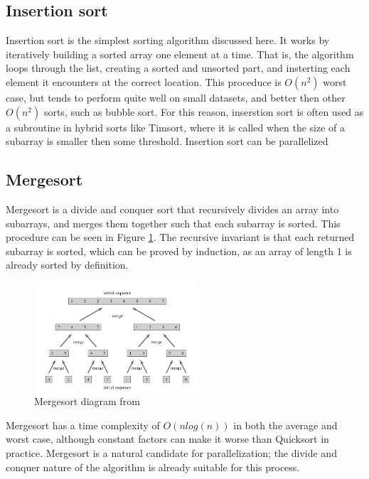 \documentclass[conference]{IEEEtran}
\begin{document}
\subsection{Insertion sort}
Insertion sort is the simplest sorting algorithm discussed here. 
It works by iteratively building a sorted array one element at a time. 
That is, the algorithm loops through the list, creating a sorted and unsorted part, and insterting each element it encounters at the correct location. 
This proceduce is $O(n^2)$ worst case, but tends to perform quite well on small datasets, and better then other $O(n^2)$ sorts, such as bubble sort. \cite{knuth_art_nodate} 
For this reason, inserstion sort is often used as a subroutine in hybrid sorts like Timsort, where it is called when the size of a subarray is smaller then some threshold. \cite{auger_et_al:LIPIcs:2018:9467} 
Insertion sort can be parallelized %
\subsection{Mergesort}
Mergesort is a divide and conquer sort that recursively divides an array into subarrays, and merges them together such that each subarray is sorted. 
This procedure can be seen in Figure \ref{mrg}.  
The recursive invariant is that each returned subarray is sorted, which can be proved by induction, as an array of length 1 is already sorted by definition. \cite{cormen_introduction_2009} 
\begin{figure}[h]
	\includegraphics[width=6cm]{merge.png} 
	\caption{Mergesort diagram from \cite{cormen_introduction_2009}}
	\label{mrg}
\end{figure}
Mergesort has a time complexity of $O(nlog(n))$ in both the average and worst case, although constant factors can make it worse than Quicksort in practice. 
Mergesort is a natural candidate for parallelization; the divide and conquer nature of the algorithm is already suitable for this process. 
\end{document}
